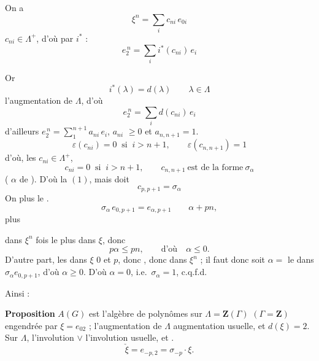 \documentclass[11pt,a4paper]{article}
\begin{document}

On a  \ill{}
\[ \xi^{n} = \sum_{i} c_{ni}\, e_{0i} \]
\ill{} $c_{ni} \in \Lambda^{+}$, d'où \ill{} \ill{} \ill{} par $i^{*}$ :
\[ e_{2}^{\,n} = \sum_{i} i^{*}(c_{ni})\, e_{i} \]


Or \ill{}
\[ i^{*}(\lambda) = d(\lambda) \qquad \lambda \in \Lambda \]
\ill{} \ill{} l'augmentation de $\Lambda$, d'où
\[ e_{2}^{\,n} = \sum_{i} d(c_{ni})\, e_{i} \]
\ill{} \ill{}  d'ailleurs \ill{} \ill{}
$e_{2}^{\,n} = \sum_{1}^{n+1} a_{ni}\, e_{i}$, \ill{} $a_{ni}$ \ill{} \ill{}
\ill{} $\geq 0$ et \ill{} $a_{n,n+1} = 1$. \ill{} \ill{}
\[ \varepsilon(c_{ni}) = 0 \ \text{ si } \ i > n+1 , \qquad
   \varepsilon(c_{n,n+1}) = 1 \]
d'où, \ill{} les $c_{ni} \in \Lambda^{+}$,
\[ c_{ni} = 0 \ \text{ si } \ i > n+1 , \qquad
   c_{n,n+1} \ \text{est de la forme} \ \sigma_{\alpha} \]
( $\alpha$  de \ill{} ). D'où la \ill{} $(1)$, mais \ill{}
doit \ill{} \ill{}
\[ c_{p,p+1} = \sigma_{\alpha} \]
On \ill{} \ill{} plus  \ill{} \ill{} le .
\[ \sigma_{\alpha}\, e_{0,p+1} = e_{\alpha,p+1} \qquad \alpha + pn , \]
\ill{} \ill{} plus


\ill{} \ill{} \ill{}  dans $\xi^{n}$ \ill{} \ill{} \ill{}
fois le plus \ill{}   dans $\xi$, \ill{}
\ill{} \ill{} \ill{} \ill{} donc
\[ p\alpha \leq pn , \qquad \text{d'où} \quad \alpha \leq 0 . \]
D'autre part, les   dans $\xi$ \ill{}
$0$ et $p$, donc \ill{}, donc \ill{} dans $\xi^{n}$ \ill{} \ill{} ; il faut
donc \ill{} \ill{} \ill{} \ill{} soit $\alpha = $ le 
 dans $\sigma_{\alpha} e_{0,p+1}$, d'où
$\alpha \geq 0$. D'où $\alpha = 0$, i.e.\ $\sigma_{\alpha} = 1$, c.q.f.d.

Ainsi :

\textbf{Proposition} $A(G)$ est l'algèbre de polynômes sur
$\Lambda = \mathbf{Z}(\Gamma)$ $(\Gamma = \mathbf{Z})$ engendrée par
$\xi = e_{02}$ ; l'augmentation de $\Lambda$ \ill{} \ill{} augmentation
usuelle, et $d(\xi) = 2$.
 Sur $\Lambda$, l'involution $\vee$ \ill{}
l'involution usuelle, et \ill{} .
\[ \check{\xi} = e_{-p,2} = \sigma_{-p} \cdot \xi . \]
\end{document}
